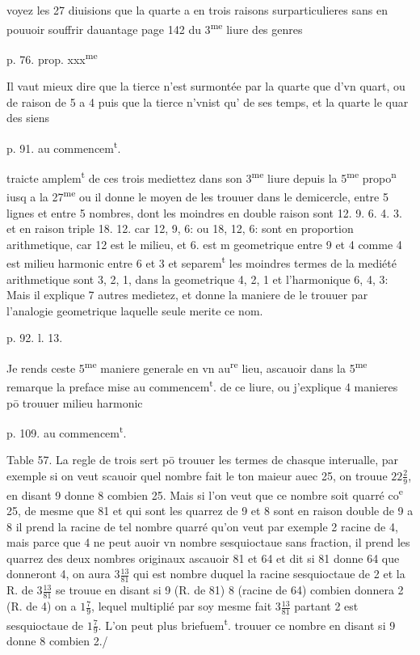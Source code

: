 \documentclass[11pt,a4paper]{article}
\begin{document}
voyez les 27 diuisions que la quarte a en trois raisons surparticulieres sans en pouuoir souffrir dauantage page 142 du 3\textsuperscript{me} liure des genres

p. 76. prop. xxx\textsuperscript{me}

Il vaut mieux dire que la tierce n'est surmontée par la quarte que d'vn quart, ou de raison de 5 a 4 puis que la tierce n'vnist qu'\struck{\ill{}}  de ses temps, et la quarte le quar des siens

p. 91. au commencem\textsuperscript{t}.

 traicte amplem\textsuperscript{t} de ces trois mediettez dans son 3\textsuperscript{me} liure depuis la 5\textsuperscript{me} propo\textsuperscript{n} iusq\ill{} a la 27\textsuperscript{me} ou il donne le moyen de les trouuer dans le demicercle, entre 5 lignes et entre 5 nombres, dont les moindres en double raison sont 12. 9. 6. 4. 3. et en raison triple 18. 12. \ill{} car 12, 9, 6: ou 18, 12, 6: sont en proportion arithmetique, car 12 est le milieu, et 6. est m\ill{} geometrique entre 9 et 4 comme 4 est milieu harmonic entre 6 et 3 et separem\textsuperscript{t} les moindres termes de la mediété arithmetique sont 3, 2, 1, dans la geometrique 4, 2, 1 et \ill{} l'harmonique 6, 4, 3: Mais il explique 7 autres medietez, et donne la maniere de le trouuer par l'analogie geometrique laquelle seule merite ce nom.

p. 92. l. 13.

Je rends ceste 5\textsuperscript{me} maniere generale en vn au\textsuperscript{re} lieu, ascauoir dans la 5\textsuperscript{me} remarque \ill{} la preface mise au commencem\textsuperscript{t}. de ce liure, ou j'explique 4 manieres pō trouuer milieu harmonic\ill{}

p. 109. au commencem\textsuperscript{t}.

Table 57. La regle de trois sert pō trouuer les termes de chasque interualle, par exemple si on veut scauoir quel nombre fait le ton maieur auec 25, on trouue $22\frac{2}{9}$, en disant \ill{} 9 donne 8 combien 25. Mais si l'on veut que ce nombre soit quarré co\textsuperscript{e} 25, de mesme que 81 et \ill{} qui sont les quarrez de 9 et 8 sont en raison double de 9 a 8 il prend la racine de tel nombre quarré qu'on veut par exemple 2 racine de 4, mais parce que 4 ne peut auoir vn nombre sesquioctaue sans fraction, il prend les quarrez des deux nombres originaux \ill{} ascauoir 81 et 64 et dit si 81 donne 64 que donneront 4, on aura $3\frac{13}{81}$ qui est nombre duquel la racine  sesquioctaue de 2 et la R. de $3\frac{13}{81}$ se trouue en disant si 9 (R. de 81) \ill{} 8 (racine de 64) combien donnera 2 (R. de 4) on a $1\frac{7}{9}$, lequel multiplié par soy mesme fait $3\frac{13}{81}$ partant 2 est sesquioctaue de $1\frac{7}{9}$. L'on peut plus briefuem\textsuperscript{t}. trouuer ce nombre en disant si 9 donne 8 combien 2./
\end{document}
